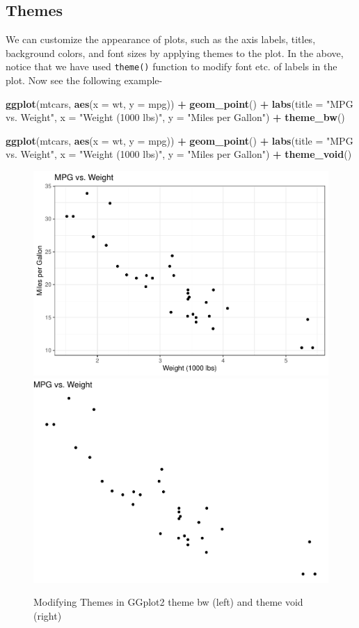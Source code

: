 \documentclass[
]{book}
\newenvironment{Shaded}{\begin{snugshade}}{\end{snugshade}}
\newcommand{\AttributeTok}[1]{\textcolor[rgb]{0.13,0.29,0.53}{#1}}
\newcommand{\FunctionTok}[1]{\textcolor[rgb]{0.13,0.29,0.53}{\textbf{#1}}}
\newcommand{\NormalTok}[1]{#1}
\newcommand{\SpecialCharTok}[1]{\textcolor[rgb]{0.81,0.36,0.00}{\textbf{#1}}}
\newcommand{\StringTok}[1]{\textcolor[rgb]{0.31,0.60,0.02}{#1}}
\begin{document}
\hypertarget{themes}{%
\subsection{Themes}\label{themes}}

We can customize the appearance of plots, such as the axis labels, titles, background colors, and font sizes by applying themes to the plot. In the above, notice that we have used \texttt{theme()} function to modify font etc. of labels in the plot. Now see the following example-

\begin{Shaded}
\begin{Highlighting}[]
\FunctionTok{ggplot}\NormalTok{(mtcars, }\FunctionTok{aes}\NormalTok{(}\AttributeTok{x =}\NormalTok{ wt, }\AttributeTok{y =}\NormalTok{ mpg)) }\SpecialCharTok{+}
  \FunctionTok{geom\_point}\NormalTok{() }\SpecialCharTok{+}
  \FunctionTok{labs}\NormalTok{(}\AttributeTok{title =} \StringTok{"MPG vs. Weight"}\NormalTok{,}
       \AttributeTok{x =} \StringTok{"Weight (1000 lbs)"}\NormalTok{,}
       \AttributeTok{y =} \StringTok{"Miles per Gallon"}\NormalTok{) }\SpecialCharTok{+}
  \FunctionTok{theme\_bw}\NormalTok{()}

\FunctionTok{ggplot}\NormalTok{(mtcars, }\FunctionTok{aes}\NormalTok{(}\AttributeTok{x =}\NormalTok{ wt, }\AttributeTok{y =}\NormalTok{ mpg)) }\SpecialCharTok{+}
  \FunctionTok{geom\_point}\NormalTok{() }\SpecialCharTok{+}
  \FunctionTok{labs}\NormalTok{(}\AttributeTok{title =} \StringTok{"MPG vs. Weight"}\NormalTok{,}
       \AttributeTok{x =} \StringTok{"Weight (1000 lbs)"}\NormalTok{,}
       \AttributeTok{y =} \StringTok{"Miles per Gallon"}\NormalTok{) }\SpecialCharTok{+}
  \FunctionTok{theme\_void}\NormalTok{()}
\end{Highlighting}
\end{Shaded}

\begin{figure}

{\centering \includegraphics[width=0.49\linewidth]{DauR_files/figure-latex/theme1-1} \includegraphics[width=0.49\linewidth]{DauR_files/figure-latex/theme1-2} 

}

\caption{Modifying Themes in GGplot2 theme bw (left) and theme void (right)}\label{fig:theme1}
\end{figure}
\end{document}
